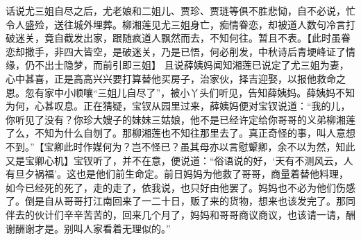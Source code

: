 \documentclass[12pt,oneside]{book}
\begin{document}
话说尤三姐自尽之后，尤老娘和二姐儿、贾珍、贾琏等俱不胜悲恸，自不必说，忙令人盛殓，送往城外埋葬。柳湘莲见尤三姐身亡，痴情眷恋，却被道人数句冷言打破迷关，竟自截发出家，跟随疯道人飘然而去，不知何往。暂且不表。【此时虽眷恋却撒手，非四大皆空，是破迷关，乃是已悟，何必削发，中秋诗后青埂峰证了情缘，仍不出士隐梦，而前引即三姐】
且说薛姨妈闻知湘莲已说定了尤三姐为妻，心中甚喜，正是高高兴兴要打算替他买房子，治家伙，择吉迎娶，以报他救命之恩。忽有家中小顺嚷“三姐儿自尽了”，被小丫头们听见，告知薛姨妈。薛姨妈不知为何，心甚叹息。正在猜疑，宝钗从园里过来，薛姨妈便对宝钗说道：“我的儿，你听见了没有？你珍大嫂子的妹妹三姑娘，他不是已经许定给你哥哥的义弟柳湘莲了么，不知为什么自刎了。那柳湘莲也不知往那里去了。真正奇怪的事，叫人意想不到。”【宝卿此时作媒何为？岂不怪已？虽其母亦以言慰颦卿，余不以为然，知此又是宝卿心机】宝钗听了，并不在意，便说道：“俗语说的好，‘天有不测风云，人有旦夕祸福’。这也是他们前生命定。前日妈妈为他救了哥哥，商量着替他料理，如今已经死的死了，走的走了，依我说，也只好由他罢了。妈妈也不必为他们伤感了。倒是自从哥哥打江南回来了一二十日，贩了来的货物，想来也该发完了。那同伴去的伙计们辛辛苦苦的，回来几个月了，妈妈和哥哥商议商议，也该请一请，酬谢酬谢才是。别叫人家看着无理似的。”
\end{document}
